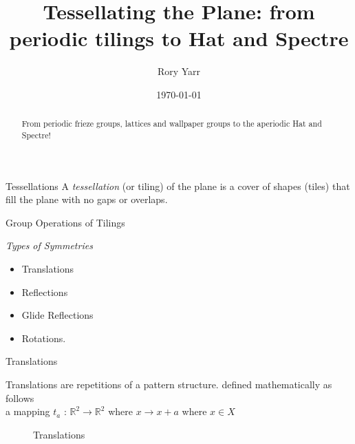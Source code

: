 \documentclass{beamer}
\title[Tilling the Plane]{Tessellating the Plane: from periodic tilings to Hat and Spectre}
\author{Rory Yarr}
\date{\today}
\begin{document}
\begin{frame}
  \titlepage

  \begin{abstract}
    From periodic frieze groups, lattices and wallpaper groups to the aperiodic Hat and Spectre!
  \end{abstract}
\end{frame}

\begin{frame}{Tessellations}
    A \emph{tessellation} (or tiling) of the plane is a cover of shapes (tiles) that fill the plane with no gaps or overlaps.
 
\end{frame}

\begin{frame}{Group Operations of Tilings}
    \begin{center}
      \emph{Types of Symmetries}
      \begin{itemize}
          \item Translations 
          \item Reflections
          \item Glide Reflections
          \item Rotations.
      \end{itemize}
    \end{center}
\end{frame}

\begin{frame}{Translations }
    \begin{center}
     Translations are repetitions of a pattern structure.  defined mathematically as follows \\ 
    a mapping $t_a$ : $\mathbb{R}^2 \rightarrow \mathbb{R}^2$ where $x \rightarrow x + a $ where $x \in X$  \cite{Angela:2023}
    \end{center}
   \begin{figure}
        \centering
        \caption{Translations}
        \label{Reflection}
    \end{figure}
\end{frame}
\end{document}
